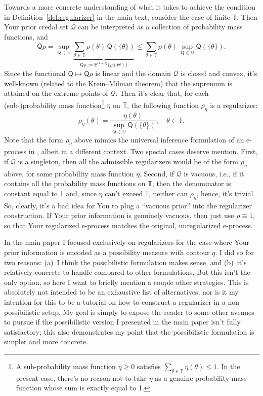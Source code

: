 \documentclass[a4paper, 12pt]{article}
\theoremstyle{plain}
\theoremstyle{definition}
\theoremstyle{remark}
\newcommand{\E}{\mathsf{E}}
\newcommand{\TT}{\mathbb{T}}
\newcommand{\prior}{\mathsf{Q}}
\newcommand{\credal}{\mathscr{Q}}
\newcommand{\uprior}{\overline{\mathsf{Q}}}
\begin{document}
Towards a more concrete understanding of what it takes to achieve the condition in Definition~\ref{def:regularizer} in the main text, consider the case of finite $\TT$.  Then Your prior credal set $\credal$ can be interpreted as a collection of probability mass functions, and 
\[ \uprior\rho = \sup_{\prior \in \credal} \underbrace{\sum_{\theta \in \TT} \rho(\theta) \, \prior(\{\theta\})}_{\prior\rho := \E^{\Theta \sim \prior}\{ \rho(\Theta)\}} \leq \sum_{\theta \in \TT} \rho(\theta) \, \sup_{\prior \in \credal} \prior(\{\theta\}). \]
Since the functional $\prior \mapsto \prior\rho$ is linear and the domain $\credal$ is closed and convex, it's well-known (related to the Krein--Milman theorem)
that the supremum is attained on the extreme points of $\credal$.  Then it's clear that, for each (sub-)probability mass function\footnote{A sub-probability mass function $\eta \geq 0$ satisfies $\sum_{\theta \in \TT} \eta(\theta) \leq 1$. In the present case, there's no reason not to take $\eta$ as a genuine probability mass function whose sum is exactly equal to 1.} 
$\eta$ on $\TT$, the following function $\rho_\eta$ is a regularizer:
\[ \rho_\eta(\theta) = \frac{\eta(\theta)}{\sup_{\prior \in \credal} \prior(\{\theta\})}, \quad \theta \in \TT. \]
Note that the form $\rho_\eta$ above mimics the universal inference formulation of an e-process in \citep[e.g.,][]{wasserman.universal}, albeit in a different context.  Two special cases deserve mention.  First, if $\credal$ is a singleton, then all the admissible regularizers would be of the form $\rho_\eta$ above, for some probability mass function $\eta$.  Second, if $\credal$ is vacuous, i.e., if it contains all the probability mass functions on $\TT$, then the denominator is constant equal to 1 and, since $\eta$ can't exceed 1, neither can $\rho_\eta$, hence, it's trivial.  So, clearly, it's a bad idea for You to plug a ``vacuous prior'' into the regularizer construction.  If Your prior information is genuinely vacuous, then just use $\rho \equiv 1$, so that Your regularized e-process matches the original, unregularized e-process.  

In the main paper I focused exclusively on regularizers for the case where Your prior information is encoded as a possibility measure with contour $q$.  I did so for two reasons: (a)~I think the possibilistic formulation makes sense, and (b)~it's relatively concrete to handle compared to other formulations.  But this isn't the only option, so here I want to briefly mention a couple other strategies.  This is absolutely not intended to be an exhaustive list of alternatives, nor is it my intention for this to be a tutorial on how to construct a regularizer in a non-possibilistic setup.  My goal is simply to expose the reader to some other avenues to pursue if the possibilistic version I presented in the main paper isn't fully satisfactory; this also demonstrates my point that the possibilistic formulation is simpler and more concrete. 
\end{document}
